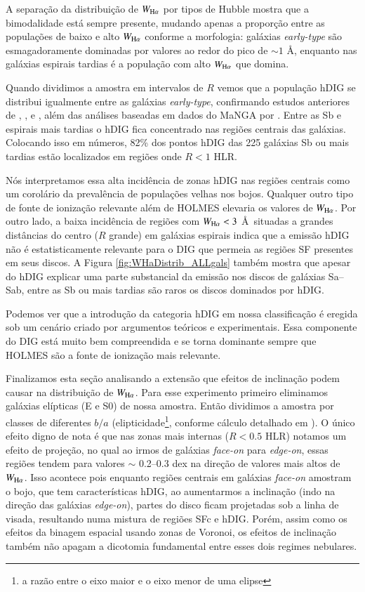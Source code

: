 A separação da distribuição de $W_{\Ha}$ por tipos de Hubble mostra que a bimodalidade está sempre presente, mudando apenas a proporção entre as populações de baixo e alto $W_{\Ha}$ conforme a morfologia: galáxias {\em early-type} são esmagadoramente dominadas por valores ao redor do pico de $\sim 1$ \AA, enquanto nas galáxias espirais tardias é a população com alto $W_{\Ha}$ que domina.

Quando dividimos a amostra em intervalos de $R$ vemos que a população hDIG se distribui igualmente entre as galáxias {\em early-type}, confirmando estudos anteriores de \citet{Kehrig.etal.2012}, \citet{Singh.etal.2013}, e \citet{Gomes.etal.2016b}, além das análises baseadas em dados do MaNGA por \citet{Belfiore.etal.2016, Belfiore.etal.2017}. Entre as Sb e espirais mais tardias o hDIG fica concentrado nas regiões centrais das galáxias. Colocando isso em números, 82\% dos pontos hDIG das 225 galáxias Sb ou mais tardias estão localizados em regiões onde $R < 1$ HLR.

Nós interpretamos essa alta incidência de zonas hDIG nas regiões centrais como um corolário da prevalência de populações velhas nos bojos.
Qualquer outro tipo de fonte de ionização relevante
além de HOLMES
elevaria os valores de $W_{\Ha}$. Por outro lado, a baixa incidência de regiões com $W_{\Ha} < 3$ \AA\ situadas a grandes distâncias do centro ($R$ grande) em galáxias espirais indica que a emissão hDIG não é estatisticamente relevante para o DIG que permeia as regiões SF presentes em seus discos. A Figura \ref{fig:WHaDistrib_ALLgals} também mostra que apesar do hDIG explicar uma parte substancial da emissão nos discos de galáxias Sa--Sab, entre as Sb ou mais tardias são raros os discos dominados por hDIG.

Podemos ver que a introdução da categoria hDIG em nossa classificação é eregida sob um cenário criado por argumentos teóricos e experimentais. Essa componente do DIG está muito bem compreendida e se torna dominante sempre que HOLMES são a fonte de ionização mais relevante.

Finalizamos esta seção analisando a extensão que efeitos de inclinação podem causar na distribuição de $W_{\Ha}$. Para esse experimento primeiro eliminamos galáxias elípticas (E e S0) de nossa amostra. Então dividimos a amostra por classes de diferentes $b/a$ (elipticidade\footnote{a razão entre o eixo maior e o eixo menor de uma elipse}, conforme cálculo detalhado em \citealt{deAmorim.etal.2017}). O único efeito digno de nota é que nas zonas mais internas ($R < 0.5$ HLR) notamos um efeito de projeção, no qual ao irmos de galáxias {\em face-on} para {\em edge-on}, essas regiões tendem para valores $\sim$ 0.2--0.3 dex na direção de valores mais altos de $W_{\Ha}$. Isso acontece pois enquanto regiões centrais em galáxias {\em face-on} amostram o bojo, que tem características hDIG, ao aumentarmos a inclinação (indo na direção das galáxias {\em edge-on}), partes do disco ficam projetadas sob a linha de visada, resultando numa mistura de regiões SFc e hDIG. Porém, assim como os efeitos da binagem espacial usando zonas de Voronoi, os efeitos de inclinação também não apagam a dicotomia fundamental entre esses dois regimes nebulares.

